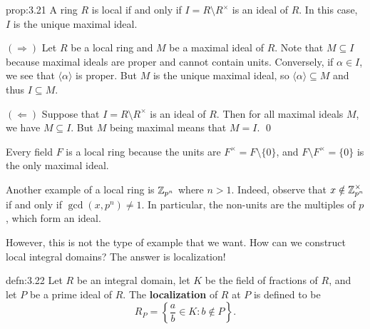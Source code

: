 \begin{prop}{prop:3.21}
    A ring $R$ is local if and only if $I = R \setminus R^\times$ is an 
    ideal of $R$. In this case, $I$ is the unique maximal ideal. 
\end{prop}\vspace{-0.25cm}
\begin{pf}
    $(\Rightarrow)$ Let $R$ be a local ring and $M$ be a maximal ideal of $R$. 
    Note that $M \subseteq I$ because maximal ideals are proper and cannot 
    contain units. Conversely, if $\alpha \in I$, we see that $\langle \alpha \rangle$ 
    is proper. But $M$ is the unique maximal ideal, so $\langle \alpha \rangle 
    \subseteq M$ and thus $I \subseteq M$. 

    $(\Leftarrow)$ Suppose that $I = R \setminus R^\times$ is an ideal of $R$. 
    Then for all maximal ideals $M$, we have $M \subseteq I$. But $M$ 
    being maximal means that $M = I$. \qed 
\end{pf}\vspace{-0.25cm}

Every field $F$ is a local ring because the units 
are $F^\times = F \setminus \{0\}$, and $F \setminus F^\times = \{0\}$ 
is the only maximal ideal. 

Another example of a local ring is $\mathbb{Z}_{p^n}$ where $n > 1$. Indeed, 
observe that $x \notin \mathbb{Z}_{p^n}^\times$ if and only if $\gcd(x, p^n) \neq 1$. 
In particular, the non-units are the multiples of $p$, which form 
an ideal. 

However, this is not the type of example that we want. How can we 
construct local integral domains? The answer is localization!

\begin{defn}{defn:3.22}
    Let $R$ be an integral domain, let $K$ be the field of fractions of $R$, 
    and let $P$ be a prime ideal of $R$. The {\bf localization} of $R$ 
    at $P$ is defined to be
    \[ R_P = \left\{\frac{a}{b} \in K : b \notin P \right\}. \] 
\end{defn}\vspace{-0.25cm}

